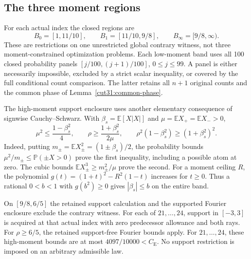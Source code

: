 \documentclass[11pt,a4paper]{article}
\numberwithin{equation}{section}
\theoremstyle{definition}
\theoremstyle{remark}
\newcommand{\E}{\mathbb E}
\newcommand{\Pp}{\mathbb P}
\newcommand{\CE}{C_{\mathrm E}}
\begin{document}
\subsection{The three moment regions}
For each actual index the closed regions are
\begin{equation}\label{cut20:rho-cover}
 B_0=[1,11/10],\qquad B_1=[11/10,9/8],\qquad
 B_\infty=[9/8,\infty).
\end{equation}
These are restrictions on one unrestricted global contrary witness,
not three moment-constrained optimization problems.
Each low-moment band uses all 100 closed probability panels
\([j/100,(j+1)/100]\), \(0\le j\le99\). A panel is either
necessarily impossible, excluded by a strict scalar inequality,
or covered by the full conditional count comparison. The latter
retains all \(n+1\) original counts and the common phase of
Lemma~\ref{cut31:common-phase}.

The high-moment support enclosure uses another elementary
consequence of signwise Cauchy--Schwarz. With
\(\beta_s=\E[X|X|]\) and
\(\mu=\E X_+=\E X_->0\),
\begin{equation}\label{cut20:signed-moment}
 \mu^2\le\frac{1-\beta_s^2}{4},\qquad
 \rho\ge\frac{1+\beta_s^2}{2\mu},\qquad
 \rho^2(1-\beta_s^2)\ge(1+\beta_s^2)^2.
\end{equation}
Indeed, putting \(m_\pm=\E X_\pm^2=(1\pm\beta_s)/2\),
the probability bounds \(\mu^2/m_\pm\le\Pp(\pm X>0)\)
prove the first inequality, including a possible atom at zero.
The cubic bounds \(\E X_\pm^3\ge m_\pm^2/\mu\) prove the
second. For a moment ceiling \(R\), the polynomial
\(g(t)=(1+t)^2-R^2(1-t)\) increases for \(t\ge0\).
Thus a rational \(0<b<1\) with \(g(b^2)\ge0\) gives
\(|\beta_s|\le b\) on the entire band.

On \([9/8,6/5]\) the retained support calculation and the
supported Fourier enclosure exclude the contrary witness.
For each of \(21,\ldots,24\), support in \([-3,3]\) is acquired
at that actual index with zero predecessor allowance and both rays.
For \(\rho\ge6/5\), the retained support-free Fourier bounds
apply. For \(21,\ldots,24\), these high-moment bounds are at most
\(4097/10000<\CE\).
No support restriction is imposed on an arbitrary admissible law.
\end{document}
